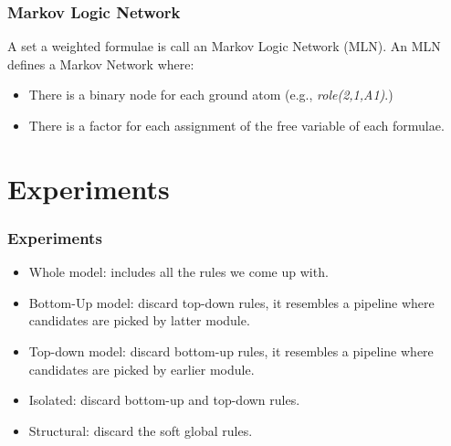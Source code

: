 \documentclass{beamer}
\begin{document}
\begin{frame}
    \frametitle{Markov Logic Network}
    A set a weighted formulae is call an Markov Logic Network (MLN). 
    An MLN defines a Markov Network where:
    \begin{itemize}
    \item There is a binary node for each ground atom (e.g., \emph{role(2,1,A1)}.)
    \item There is a factor for each assignment of the free variable of each formulae. 
    \end{itemize}


\end{frame}

\section{Experiments}
\begin{frame}
    \frametitle{Experiments}

    \begin{itemize}
    \item Whole model: includes all the rules we come up with.
    \item Bottom-Up model: discard top-down rules, it resembles a pipeline where candidates are picked by latter module.
    \item Top-down model: discard bottom-up rules, it resembles a pipeline where candidates are picked by earlier module.
    \item Isolated: discard bottom-up and top-down rules.
    \item Structural: discard the soft global rules.
    \end{itemize}
\end{frame}
\end{document}
